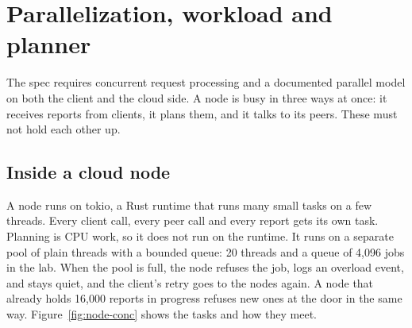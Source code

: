 \section{Parallelization, workload and planner}
\label{sec:conc}

The spec requires concurrent request processing and a documented parallel model on both the client and the cloud side. A node is busy in three ways at once: it receives reports from clients, it plans them, and it talks to its peers. These must not hold each other up.

\subsection{Inside a cloud node}

A node runs on tokio, a Rust runtime that runs many small tasks on a few threads. Every client call, every peer call and every report gets its own task. Planning is CPU work, so it does not run on the runtime. It runs on a separate pool of plain threads with a bounded queue: 20 threads and a queue of 4,096 jobs in the lab. When the pool is full, the node refuses the job, logs an overload event, and stays quiet, and the client's retry goes to the nodes again. A node that already holds 16,000 reports in progress refuses new ones at the door in the same way. Figure~\ref{fig:node-conc} shows the tasks and how they meet.

